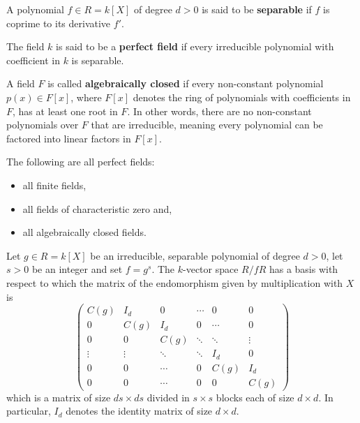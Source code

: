 \documentclass[12pt, a4paper]{article}
\begin{document}
\begin{definition}
    A polynomial \(f\in R=k[X]\) of degree \(d>0\) is said to be \textbf{separable} if \(f\) is coprime to its derivative \(f'\).
\end{definition}

\begin{definition}
    The field \(k\) is said to be a \textbf{perfect field} if every irreducible polynomial with coefficient in \(k\) is separable.
\end{definition}

\begin{definition}
    A field \( F \) is called \textbf{algebraically closed} if every non-constant polynomial \( p(x) \in F[x] \), where \( F[x] \) denotes the ring of polynomials with coefficients in \( F \), has at least one root in \( F \). In other words, there are no non-constant polynomials over \( F \) that are irreducible, meaning every polynomial can be factored into linear factors in \( F[x] \).
\end{definition}

\begin{mdthm}
    The following are all perfect fields:
    \begin{itemize}
        \item all finite fields,
        \item all fields of characteristic zero and,
        \item all algebraically closed fields.
    \end{itemize}
\end{mdthm}

\begin{theorem}
    Let \( g \in R = k[X] \) be an irreducible, separable polynomial of degree \( d > 0 \), let \( s > 0 \) be an integer and set \( f = g^s \). The \( k \)-vector space \( R/fR \) has a basis with respect to which the matrix of the endomorphism given by multiplication with \( X \) is
    \[
    \begin{pmatrix}
    C(g) & I_d & 0 & \cdots & 0 & 0 \\
    0 & C(g) & I_d & 0 & \cdots & 0 \\
    0 & 0 & C(g) & \ddots & \ddots & \vdots \\
    \vdots & \vdots & \ddots & \ddots & I_d & 0 \\
    0 & 0 & \cdots & 0 & C(g) & I_d \\
    0 & 0 & \cdots & 0 & 0 & C(g) 
    \end{pmatrix}
    \]
    which is a matrix of size \( ds \times ds \) divided in \( s \times s \) blocks each of size \( d \times d \). In particular, \( I_d \) denotes the identity matrix of size \( d \times d \).
\end{theorem}
\end{document}
